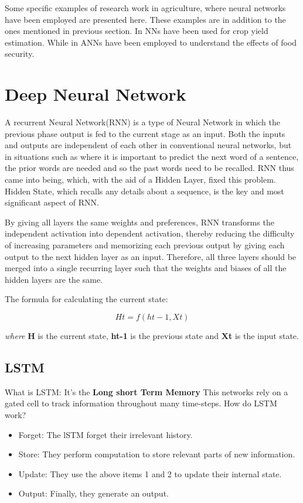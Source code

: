 Some specific examples of research work in agriculture, where neural networks have been employed are presented here. These examples are in addition to the ones mentioned in previous section. In \cite{ghielmi2006descriptive} NNs have been used for crop yield estimation. While in \cite{goyal2013artificial} ANNs have been employed to understand the effects of food security.  

\section{Deep Neural Network}

A recurrent Neural Network(RNN) is a type of Neural Network in which the previous phase output is fed to the current stage as an input. Both the inputs and outputs are independent of each other in conventional neural networks, but in situations such as where it is important to predict the next word of a sentence, the prior words are needed and so the past words need to be recalled. RNN thus came into being, which, with the aid of a Hidden Layer, fixed this problem. Hidden State, which recalls any details about a sequence, is the key and most significant aspect of RNN.\cite{jain1999recurrent}

By giving all layers the same weights and preferences, RNN transforms the independent activation into dependent activation, thereby reducing the difficulty of increasing parameters and memorizing each previous output by giving each output to the next hidden layer as an input.
Therefore, all three layers should be merged into a single recurring layer such that the weights and biases of all the hidden layers are the same.

The formula for calculating the current state:

\[Ht = f(ht-1, Xt)\]

\textit{where} \textbf{H} is the current state, \textbf{ht-1} is the previous state and \textbf{Xt} is the input state.


\subsection{LSTM}
What is LSTM: It's the \textbf{Long short Term Memory} This networks rely on a gated cell to track information throughout many time-steps. How do LSTM work?

\begin{itemize}
	\item Forget: The lSTM forget their irrelevant history.
	
	
	\item Store: They perform computation to store relevant parts of new information.
	
	
	\item Update: They use the above items 1 and 2 to update their internal state.
	
	
	\item Output: Finally, they generate an output.
\end{itemize}

